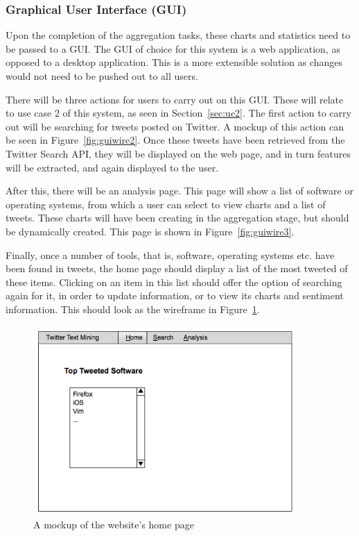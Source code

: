 \subsubsection[Graphical User Interface]{Graphical User Interface (GUI)}
Upon the completion of the aggregation tasks, these charts and statistics need to be passed to a GUI. The GUI of choice for this system is a web application, as opposed to a desktop application. This is a more extensible solution as changes would not need to be pushed out to all users.

There will be three actions for users to carry out on this GUI. These will relate to use case 2 of this system, as seen in Section~\ref{sec:uc2}. The first action to carry out will be searching for tweets posted on Twitter. A mockup of this action can be seen in Figure~\ref{fig:guiwire2}. Once these tweets have been retrieved from the Twitter Search API, they will be displayed on the web page, and in turn features will be extracted, and again displayed to the user.

After this, there will be an analysis page. This page will show a list of software or operating systems, from which a user can select to view charts and a list of tweets. These charts will have been creating in the aggregation stage, but should be dynamically created. This page is shown in Figure~\ref{fig:guiwire3}.

Finally, once a number of tools, that is, software, operating systems etc. have been found in tweets, the home page should display a list of the most tweeted of these items. Clicking on an item in this list should offer the option of searching again for it, in order to update information, or to view its charts and sentiment information. This should look as the wireframe in Figure~\ref{fig:guiwire1}.

\begin{figure}[h]
\begin{center}
\includegraphics[width=10cm]{guiwire1}
\end{center}
\caption{A mockup of the website's home page}
\label{fig:guiwire1}
\end{figure}

